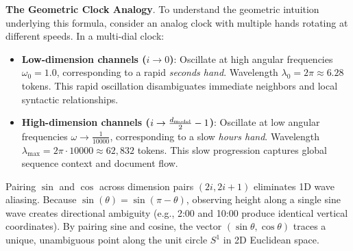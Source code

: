 \documentclass[../../../main.tex]{subfiles}
\begin{document}
\noindent\textbf{The Geometric Clock Analogy}.\newline
To understand the geometric intuition underlying this formula, consider an analog clock with multiple hands rotating at different speeds. In a multi-dial clock:
\begin{itemize}
    \item \textbf{Low-dimension channels ($i \to 0$)}: Oscillate at high angular frequencies $\omega_0 = 1.0$, corresponding to a rapid \emph{seconds hand}. Wavelength $\lambda_0 = 2\pi \approx 6.28$ tokens. This rapid oscillation disambiguates immediate neighbors and local syntactic relationships.
    \item \textbf{High-dimension channels ($i \to \frac{d_{\text{model}}}{2}-1$)}: Oscillate at low angular frequencies $\omega \to \frac{1}{10000}$, corresponding to a slow \emph{hours hand}. Wavelength $\lambda_{\max} = 2\pi \cdot 10000 \approx 62{,}832$ tokens. This slow progression captures global sequence context and document flow.
\end{itemize}

Pairing $\sin$ and $\cos$ across dimension pairs $(2i, 2i+1)$ eliminates 1D wave aliasing. Because $\sin(\theta) = \sin(\pi - \theta)$, observing height along a single sine wave creates directional ambiguity (e.g., 2:00 and 10:00 produce identical vertical coordinates). By pairing sine and cosine, the vector $(\sin \theta, \cos \theta)$ traces a unique, unambiguous point along the unit circle $S^1$ in 2D Euclidean space.
\end{document}
